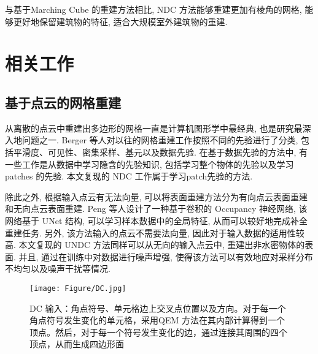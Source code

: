 与基于Marching Cube \cite{lorensen1987marching}的重建方法相比, NDC 方法能够重建更加有棱角的网格, 能够更好地保留建筑物的特征, 适合大规模室外建筑物的重建. 

\section{相关工作}

\subsection{基于点云的网格重建}
从离散的点云中重建出多边形的网格一直是计算机图形学中最经典, 也是研究最深入地问题之一. Berger 等人\cite{berger2017survey}对以往的网格重建工作按照不同的先验进行了分类, 包括平滑度、可见性、密集采样、基元以及数据先验. 在基于数据先验的方法中, 有一些工作是从数据中学习隐含的先验知识, 包括学习整个物体的先验\cite{peng2021shape}以及学习 patches 的先验\cite{Shen:2012}. 本文复现的 NDC 工作属于学习patch先验的方法. 

除此之外, 根据输入点云有无法向量, 可以将表面重建方法分为有向点云表面重建\cite{kazhdan2006poisson}和无向点云表面重建\cite{atzmon2020sal}. Peng 等人\cite{tang2021sa}设计了一种基于卷积的 Occupancy 神经网络, 该网络基于 UNet \cite{ronneberger2015u}结构, 可以学习样本数据中的全局特征, 从而可以较好地完成补全重建任务. 另外, 该方法输入的点云不需要法向量, 因此对于输入数据的适用性较高. 本文复现的 UNDC 方法同样可以从无向的输入点云中, 重建出非水密物体的表面. 并且, 通过在训练中对数据进行噪声增强, 使得该方法可以有效地应对采样分布不均匀以及噪声干扰等情况. 

\begin{figure}[H]
	\center
	\texttt{[image: Figure/DC.jpg]}
	\centering
	\caption{DC 输入：角点符号、单元格边上交叉点位置以及方向。对于每一个角点符号发生变化的单元格，采用QEM 方法在其内部计算得到一个顶点。然后，对于每一个符号发生变化的边，通过连接其周围的四个顶点，从而生成四边形面}\label{fig:fig1}
\end{figure}

